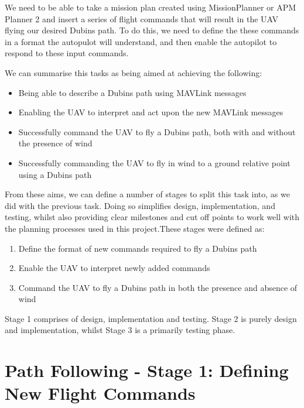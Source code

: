 We need to be able to take a mission plan created using MissionPlanner or APM Planner 2 and insert a series of flight commands that will result in the UAV flying our desired Dubins path. To do this, we need to define the these commands in a format the autopulot will understand, and then enable the autopilot to respond to these input commands. 

We can summarise this tasks as being aimed at achieving the following:

\begin{itemize}
	\item Being able to describe a Dubins path using MAVLink messages %
	\item Enabling the UAV to interpret and act upon the new MAVLink messages
	\item Successfully command the UAV to fly a Dubins path, both with and without the presence of wind
	\item Successfully commanding the UAV to fly in wind to a ground relative point using a Dubins path 
\end{itemize}

From these aims, we can define a number of stages to split this task into, as we did with the previous task. Doing so simplifies design, implementation, and testing, whilst also providing clear milestones and cut off points to work well with the planning processes used in this project.These stages were defined as:

\begin{enumerate}
	\item Define the format of new commands required to fly a Dubins path
	\item Enable the UAV to interpret newly added commands
	\item Command the UAV to fly a Dubins path in both the presence and absence of wind
\end{enumerate}

Stage 1 comprises of design, implementation and testing. Stage 2 is purely design and implementation, whilst Stage 3 is a primarily testing phase.  

\section{Path Following - Stage 1: Defining New Flight Commands}
\label{task2:stage1}


